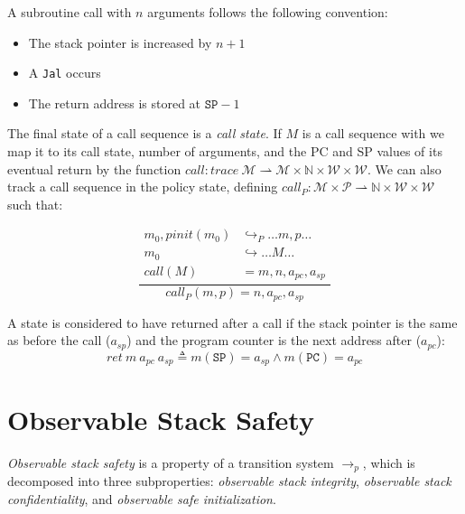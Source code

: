 \documentclass[conference]{IEEEtran}
\begin{document}
      A subroutine call with \(n\) arguments follows the following convention:

      \begin{itemize}
        \item The stack pointer is increased by \(n+1\)
        \item A {\tt Jal} occurs
        \item The return address is stored at \(\mathtt{SP} - 1\)
      \end{itemize}

      The final state of a call sequence is a {\it call state}. If \(M\) is a call sequence with
      we map it to its call state, number of arguments, and the PC and SP values of its eventual
      return by the function \(\mathit{call} : \mathit{trace}\ \mathcal{M} \rightharpoonup \mathcal{M}
      \times \mathbb{N} \times \mathcal{W} \times \mathcal{W}\). We can also track a call sequence in the
      policy state, defining \(\mathit{call}_P : \mathcal{M} \times \mathcal{P} \rightharpoonup \mathbb{N}
      \times \mathcal{W} \times \mathcal{W}\) such that:

      \[\frac{\begin{split}
        m_0,\mathit{pinit}(m_0) & \hookrightarrow_P \dots m,p \dots \\ %
        m_0 & \hookrightarrow \dots M \dots \\
        \mathit{call}(M) & = m, n, a_{pc}, a_{sp}\end{split}}
             {\mathit{call}_P(m,p) = n, a_{pc}, a_{sp}}\]

      A state is considered to have returned after a call if the stack pointer is the same as before the call
      (\(a_{sp}\)) and the program counter is the next address after (\(a_{pc}\)):
      \[\mathit{ret}\ m\ a_{pc}\ a_{sp} \triangleq m(\mathtt{SP}) = a_{sp} \land m(\mathtt{PC}) = a_{pc}\]

  \section{Observable Stack Safety}

    {\it Observable stack safety} is a property of a transition system \(\longrightarrow_p\),
    which is decomposed into three subproperties: {\it observable stack integrity},
    {\it observable stack confidentiality}, and {\it observable safe initialization}. 

\end{document}
